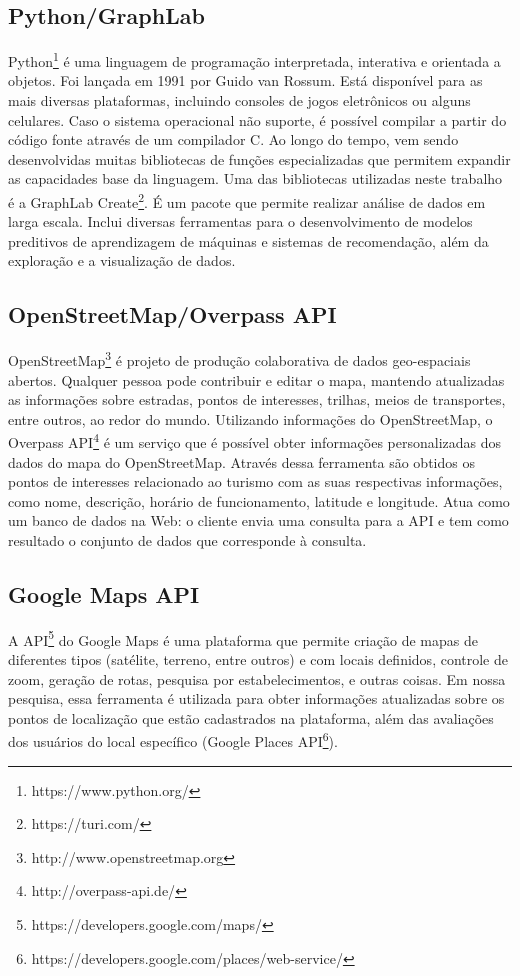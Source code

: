 \subsection{Python/GraphLab}

Python\footnote{https://www.python.org/} é uma linguagem de programação interpretada, interativa e orientada a objetos. Foi lançada em 1991 por Guido van Rossum. Está disponível para as mais diversas plataformas, incluindo consoles de jogos eletrônicos ou alguns celulares. Caso o sistema operacional não suporte, é possível compilar a partir do código fonte através de um compilador C. Ao longo do tempo, vem sendo desenvolvidas muitas bibliotecas de funções especializadas que permitem expandir as capacidades base da linguagem.
Uma das bibliotecas utilizadas neste trabalho é a GraphLab Create\footnote{https://turi.com/}. É um pacote que permite realizar análise de dados em larga escala. Inclui diversas ferramentas para o desenvolvimento de modelos preditivos de aprendizagem de máquinas e sistemas de recomendação, além da exploração e a visualização de dados.

\subsection{OpenStreetMap/Overpass API}

OpenStreetMap\footnote{http://www.openstreetmap.org} é projeto de produção colaborativa de dados geo-espaciais abertos. Qualquer pessoa pode contribuir e editar o mapa, mantendo atualizadas as informações sobre estradas, pontos de interesses, trilhas, meios de transportes, entre outros, ao redor do mundo. Utilizando informações do OpenStreetMap, o Overpass API\footnote{http://overpass-api.de/} é um serviço que é possível obter informações personalizadas dos dados do mapa do OpenStreetMap. Através dessa ferramenta são obtidos os pontos de interesses relacionado ao turismo com as suas respectivas informações, como nome, descrição, horário de funcionamento, latitude e longitude. Atua como um banco de dados na Web: o cliente envia uma consulta para a API e tem como resultado o conjunto de dados que corresponde à consulta.

\subsection{Google Maps API}

A API\footnote{https://developers.google.com/maps/} do Google Maps é uma plataforma que permite criação de mapas de diferentes tipos (satélite, terreno, entre outros) e com locais definidos, controle de zoom, geração de rotas, pesquisa por estabelecimentos, e outras coisas.
Em nossa pesquisa, essa ferramenta é utilizada para obter informações atualizadas sobre os pontos de localização que estão cadastrados na plataforma, além das avaliações dos usuários do local específico (Google Places API\footnote{https://developers.google.com/places/web-service/}).

